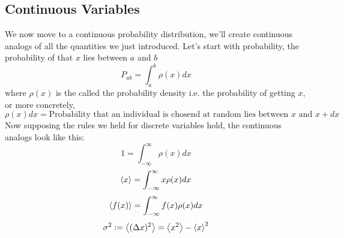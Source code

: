\subsection{Continuous Variables}
We now move to a continuous probability distribution, we'll create continuous analogs of all the quantities we just introduced. Let's start with probability, the probability of that $x$ lies between $a$ and $b$
\begin{equation}
	P_{ab} = \int_{a}^{b} \rho(x) dx
\end{equation}
where $\rho(x)$ is the called the probability density i.e. the probability of getting $x$, or more concretely,
$$\rho(x)dx = \text{Probability that an individual is chosend at random lies between } x \text{ and } x + dx$$
Now supposing the rules we held for discrete variables hold, the continuous analogs look like this:
\begin{equation}
	1 = \int_{- \infty}^{\infty} \rho(x) dx
\end{equation}
\begin{equation}
	\expval{x} = \int_{- \infty}^{\infty} x \rho(x) dx
\end{equation}
\begin{equation}
	\expval{f(x)} = \int_{- \infty}^{\infty} f(x) \rho(x) dx
\end{equation}
\begin{equation}
	\sigma^{2} := \expval{(\Delta x)^{2}} = \expval{x^{2}} - {\expval{x}}^{2}
\end{equation}
